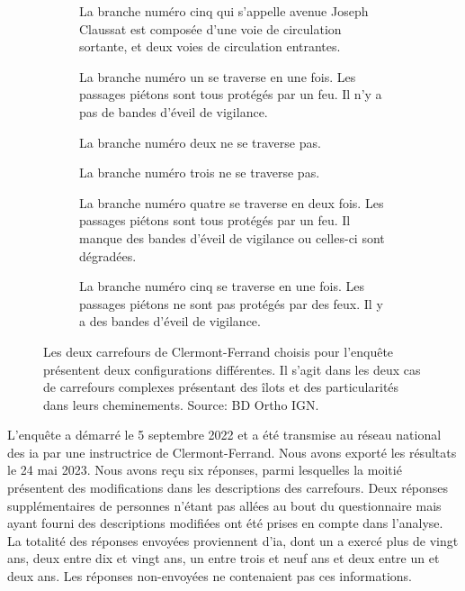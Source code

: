 \begin{figure}[H]
\begin{subfigure}[t]{\linewidth}
\begin{minipage}[t]{0.49\linewidth}
            La branche numéro cinq qui s'appelle avenue Joseph Claussat est composée d'une voie de circulation sortante, et deux voies de circulation entrantes.

            \vspace{5pt}

            La branche numéro un se traverse en une fois. Les passages piétons sont tous protégés par un feu. Il n'y a pas de bandes d'éveil de vigilance.

            \vspace{5pt}

            La branche numéro deux ne se traverse pas.

            \vspace{5pt}

            La branche numéro trois ne se traverse pas.

            \vspace{5pt}

            La branche numéro quatre se traverse en deux fois. Les passages piétons sont tous protégés par un feu. Il manque des bandes d'éveil de vigilance ou celles-ci sont dégradées.

            \vspace{5pt}
            
            La branche numéro cinq se traverse en une fois. Les passages piétons ne sont pas protégés par des feux. Il y a des bandes d'éveil de vigilance.
        \end{minipage}
    \end{subfigure}
    \caption{Les deux carrefours de Clermont-Ferrand choisis pour l'enquête présentent deux configurations différentes. Il s'agit dans les deux cas de carrefours complexes présentant des îlots et des particularités dans leurs cheminements. Source: BD Ortho IGN.}
    \label{fig:evaluation_carrefours_enquete}
\end{figure}

\newpar{}

L'enquête a démarré le 5 septembre 2022 et a été transmise au réseau national des \gls{ia} par une instructrice de Clermont-Ferrand. Nous avons exporté les résultats le 24 mai 2023. Nous avons reçu six réponses, parmi lesquelles la moitié présentent des modifications dans les descriptions des carrefours. Deux réponses supplémentaires de personnes n'étant pas allées au bout du questionnaire mais ayant fourni des descriptions modifiées ont été prises en compte dans l'analyse. La totalité des réponses envoyées proviennent d'\gls{ia}, dont un a exercé plus de vingt ans, deux entre dix et vingt ans, un entre trois et neuf ans et deux entre un et deux ans. Les réponses non-envoyées ne contenaient pas ces informations.

